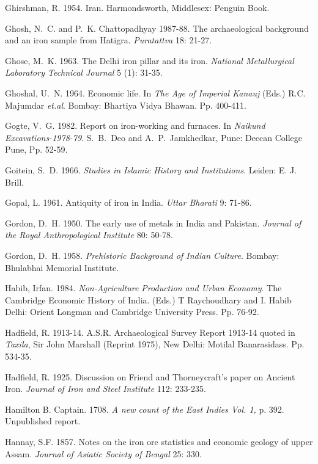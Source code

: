 \begin{thebibliography}{99}
 Ghirshman, R. 1954. Iran. Harmondsworth, Middlesex: Penguin Book.

 Ghosh, N.~C. and P.~K. Chattopadhyay 1987-88. The archaeological background and an iron sample from Hatigra. \textit{Puratattva} 18: 21-27.

 Ghose, M.~K. 1963. The Delhi iron pillar and its iron. \textit{National Metallurgical Laboratory Technical Journal} 5 (1): 31-35. 

 Ghoshal, U.~N. 1964. Economic life. In \textit{The Age of Imperial Kanauj} (Eds.) R.C. Majumdar \textit{et.al}. Bombay: Bhartiya Vidya Bhawan. Pp. 400-411. 
 
 Gogte, V.~G. 1982. Report on iron-working and furnaces. In \textit{Naikund Excavations-1978-79}. S.~B.~Deo and A.~P.~Jamkhedkar, Pune: Deccan College Pune, Pp. 52-59.

 Goitein, S.~D. 1966. \textit{Studies in Islamic History and Institutions}. Leiden: E. J. Brill.

 Gopal, L. 1961. Antiquity of iron in India. \textit{Uttar Bharati} 9: 71-86.

 Gordon, D.~H. 1950. The early use of metals in India and Pakistan. \textit{Journal of the Royal Anthropological Institute} 80: 50-78.

 Gordon, D.~H. 1958. \textit{Prehistoric Background of Indian Culture}. Bombay: Bhulabhai Memorial Institute.  

 Habib, Irfan. 1984. \textit{Non-Agriculture Production and Urban Economy}. The Cambridge Economic History of India. (Eds.) T Raychoudhary and I. Habib Delhi: Orient Longman and Cambridge University Press. Pp. 76-92.

 Hadfield, R. 1913-14. A.S.R. Archaeological Survey Report 1913-14 quoted in \textit{Taxila}, Sir John Marshall (Reprint 1975), New Delhi: Motilal Banarasidass. Pp. 534-35.

 Hadfield, R. 1925. Discussion on Friend and Thorneycraft’s paper on Ancient Iron. \textit{Journal of Iron and Steel Institute} 112: 233-235.

 Hamilton B. Captain. 1708. \textit{A new count of the East Indies Vol. 1,} p. 392. Unpublished report.

 Hannay, S.F. 1857. Notes on the iron ore statistics and economic geology of upper Assam. \textit{Journal of Asiatic Society of Bengal }25: 330. 


\end{thebibliography}

